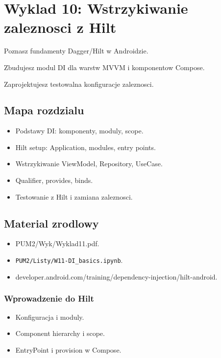 \chapter{Wyklad 10: Wstrzykiwanie zaleznosci z Hilt}

\begin{learningobjectives}
  \item Poznasz fundamenty Dagger/Hilt w Androidzie.
  \item Zbudujesz modul DI dla warstw MVVM i komponentow Compose.
  \item Zaprojektujesz testowalna konfiguracje zaleznosci.
\end{learningobjectives}

\section{Mapa rozdzialu}
\begin{itemize}
  \item Podstawy DI: komponenty, moduly, scope.
  \item Hilt setup: Application, modules, entry points.
  \item Wstrzykiwanie ViewModel, Repository, UseCase.
  \item Qualifier, provides, binds.
  \item Testowanie z Hilt i zamiana zaleznosci.
\end{itemize}

\section{Material zrodlowy}
\begin{itemize}
  \item PUM2/Wyk/Wyklad11.pdf.
  \item \texttt{PUM2/Listy/W11-DI\_basics.ipynb}.
  \item developer.android.com/training/dependency-injection/hilt-android.
\end{itemize}

\subsection{Wprowadzenie do Hilt}
\begin{itemize}
  \item Konfiguracja i moduly.
  \item Component hierarchy i scope.
  \item EntryPoint i provision w Compose.
\end{itemize}

